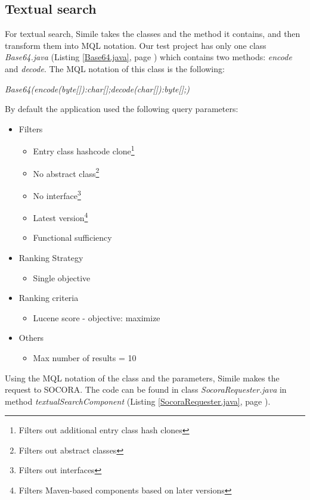 \subsection{Textual search}
For textual search, Simile takes the classes and the method it contains, and then transform them into MQL notation. Our test project has only one class \emph{Base64.java} (Listing \ref{Base64.java}, page \pageref{Base64.java}) which contains two methods: \emph{encode} and \emph{decode}. The MQL notation of this class is the following:

\begin{displayquote}
\emph{Base64(encode(byte[]):char[];decode(char[]):byte[];)}
\end{displayquote}

By default the application used the following query parameters:

\begin{itemize}
\item Filters
	\begin{itemize}
	\item Entry class hashcode clone\footnote{Filters out additional entry class hash clones}
	\item No abstract class\footnote{Filters out abstract classes}
	\item No interface\footnote{Filters out interfaces}
	\item Latest version\footnote{Filters Maven-based components based on later versions}
	\item Functional sufficiency
	\end{itemize}
\item Ranking Strategy
	\begin{itemize}
	\item Single objective
	\end{itemize}
\item Ranking criteria
	\begin{itemize}
	\item Lucene score - objective: maximize
	\end{itemize}
\item Others
	\begin{itemize}
	\item Max number of results = 10
	\end{itemize}
\end{itemize}

Using the MQL notation of the class and the parameters, Simile makes the request to SOCORA. The code can be found in class \emph{SocoraRequester.java} in method \emph{textualSearchComponent} (Listing \ref{SocoraRequester.java}, page \pageref{SocoraRequester.java}). 

